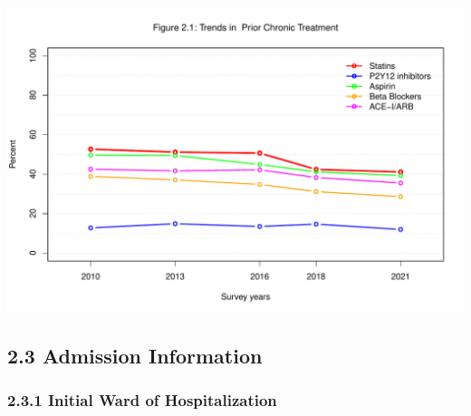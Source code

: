 \documentclass[
]{article}
\begin{document}
\hfill\break

\includegraphics{‏‏ACSIS_2024_v1_with_trend_pdf_files/figure-latex/unnamed-chunk-115-1.pdf}

\pagebreak

\subsection{2.3 Admission Information}\label{admission-information}

\subsubsection{2.3.1 Initial Ward of
Hospitalization}\label{initial-ward-of-hospitalization}
\end{document}
